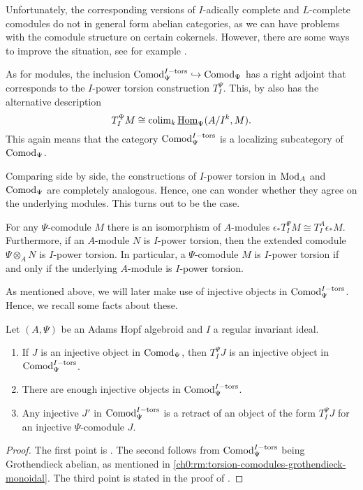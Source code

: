 \begin{remark}
    \label{ch0:rm:complete-comodules-not-abelian}
    Unfortunately, the corresponding versions of $I$-adically complete and $L$-complete comodules do not in general form abelian categories, as we can have problems with the comodule structure on certain cokernels. However, there are some ways to improve the situation, see for example \cite{baker_2009}. 
\end{remark}

\begin{remark}
    As for modules, the inclusion $\mathrm{Comod}_\Psi^{I-\mathrm{tors}}\hookrightarrow \mathrm{Comod}_\Psi$ has a right adjoint that corresponds to the $I$-power torsion construction $T_I^\Psi$. This, by \cite[5.5]{barthel-heard-valenzuela_2018} also has the alternative description
    \[T_I^\Psi M \cong \operatorname{colim}_k \operatorname{\underline{Hom}}_\Psi (A/I^k, M).\]
    This again means that the category $\mathrm{Comod}_\Psi^{I-\mathrm{tors}}$ is a localizing subcategory of $\mathrm{Comod}_\Psi$. 
\end{remark}

Comparing side by side, the constructions of $I$-power torsion in $\mathrm{Mod}_A$ and $\mathrm{Comod}_\Psi$ are completely analogous. Hence, one can wonder whether they agree on the underlying modules. This turns out to be the case. 

\begin{lemma}
    \label{ch0:lm:torsion-comodule-iff-torsion-module}
    For any $\Psi$-comodule $M$ there is an isomorphism of $A$-modules $\epsilon_* T^\Psi_I M \cong T^A_I \epsilon_* M.$
    Furthermore, if an $A$-module $N$ is $I$-power torsion, then the extended comodule $\Psi\otimes_A N$ is $I$-power torsion. In particular, a $\Psi$-comodule $M$ is $I$-power torsion if and only if the underlying $A$-module is $I$-power torsion. 
\end{lemma}

As mentioned above, we will later make use of injective objects in $\mathrm{Comod}_\Psi^{I-\mathrm{tors}}$. Hence, we recall some facts about these. 

\begin{lemma}
    \label{ch0:lm:injectives-in-torsion-comodules}
    Let $(A, \Psi)$ be an Adams Hopf algebroid and $I$ a regular invariant ideal.
    \begin{enumerate}
        \item If $J$ is an injective object in $\mathrm{Comod}_\Psi$, then $T_I^\Psi J$ is an injective object in $\mathrm{Comod}_\Psi^{I-\mathrm{tors}}$.
        \item There are enough injective objects in $\mathrm{Comod}_\Psi^{I-\mathrm{tors}}$.
        \item Any injective $J'$ in $\mathrm{Comod}_\Psi^{I-\mathrm{tors}}$ is a retract of an object of the form $T_I^\Psi J$ for an injective $\Psi$-comodule $J$.
    \end{enumerate} 
\end{lemma}
\begin{proof}
    The first point is \cite[2.1.4]{brodmann-sharp_1998}. The second follows from $\mathrm{Comod}_\Psi^{I-\mathrm{tors}}$ being Grothendieck abelian, as mentioned in \cref{ch0:rm:torsion-comodules-grothendieck-monoidal}. The third point is stated in the proof of \cite[3.16]{barthel-heard-valenzuela_2020}. 
\end{proof}

